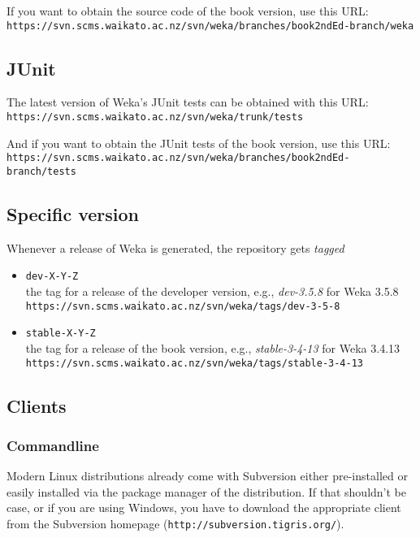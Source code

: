 \noindent If you want to obtain the source code of the book version, use this URL:\\

\verb=https://svn.scms.waikato.ac.nz/svn/weka/branches/book2ndEd-branch/weka=\\

\subsection{JUnit}
The latest version of Weka's JUnit tests can be obtained with this URL:\\

\verb=https://svn.scms.waikato.ac.nz/svn/weka/trunk/tests=

\noindent And if you want to obtain the JUnit tests of the book version, use this URL:\\

\verb=https://svn.scms.waikato.ac.nz/svn/weka/branches/book2ndEd-branch/tests=

\subsection{Specific version}
Whenever a release of Weka is generated, the repository gets \textit{tagged}

\begin{itemize}
\item \verb=dev-X-Y-Z=\\the tag for a release of the developer version, e.g., \textit{dev-3.5.8} for Weka 3.5.8\\
\verb=https://svn.scms.waikato.ac.nz/svn/weka/tags/dev-3-5-8=
\item \verb=stable-X-Y-Z=\\ the tag for a release of the book version, e.g., \textit{stable-3-4-13} for Weka 3.4.13\\
\verb=https://svn.scms.waikato.ac.nz/svn/weka/tags/stable-3-4-13=
\end{itemize}

\subsection{Clients}
\subsubsection*{Commandline}
Modern Linux distributions already come with Subversion either
pre-installed or easily installed via the package manager of the
distribution. If that shouldn't be case, or if you are using Windows,
you have to download the appropriate client from the Subversion
homepage (\verb=http://subversion.tigris.org/=).

